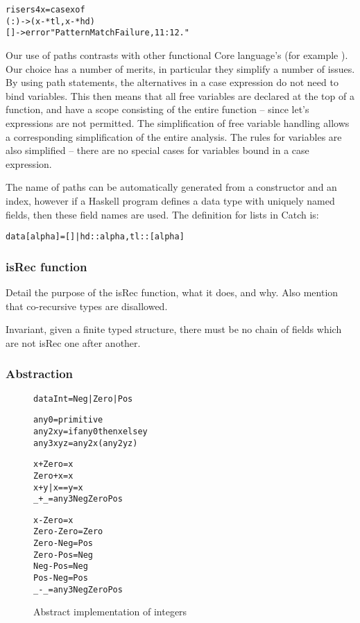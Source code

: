 \documentclass[preprint]{sigplanconf}
\newcommand{\C}[1]{\textsf{#1}}
\newenvironment{code}{\begin{alltt}\small}{\end{alltt}}
\begin{document}
\begin{code}
risers4 x = case x of
    (:) -> (x-*tl, x-*hd)
    [] -> error "Pattern Match Failure, 11:12."
\end{code}

Our use of paths contrasts with other functional Core language's (for example \citet{ghc_core}). Our choice has a number of merits, in particular they simplify a number of issues. By using path statements, the alternatives in a \C{case} expression do not need to bind variables. This then means that all free variables are declared at the top of a function, and have a scope consisting of the entire function -- since let's expressions are not permitted. The simplification of free variable handling allows a corresponding simplification of the entire analysis. The rules for variables are also simplified -- there are no special cases for variables bound in a case expression.

The name of paths can be automatically generated from a constructor and an index, however if a Haskell program defines a data type with uniquely named fields, then these field names are used. The definition for lists in Catch is:

\begin{code}
data [alpha] = [] | {hd :: alpha, tl :: [alpha]}
\end{code}

\subsubsection{\C{isRec} function}

Detail the purpose of the \C{isRec} function, what it does, and why. Also mention that co-recursive types are disallowed.

Invariant, given a finite typed structure, there must be no chain of fields which are not \C{isRec} one after another.

\subsubsection{Abstraction}

\begin{figure}
\begin{code}
data Int = Neg | Zero | Pos

any0 = primitive
any2 x y = if any0 then x else y
any3 x y z = any2 x (any2 y z)

x     + Zero  = x
Zero  + x     = x
x     + y     | x == y = x
_     + _     = any3 Neg Zero Pos

x     - Zero  = x
Zero  - Zero  = Zero
Zero  - Neg   = Pos
Zero  - Pos   = Neg
Neg   - Pos   = Neg
Pos   - Neg   = Pos
_     - _     = any3 Neg Zero Pos
\end{code}
\caption{Abstract implementation of integers}
\label{fig:abstract_int}
\end{figure}
\end{document}
